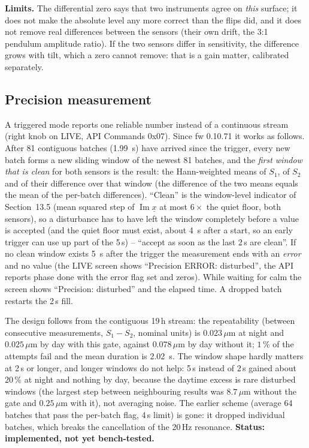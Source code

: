 \documentclass[11pt,a4paper]{article}
\begin{document}
\textbf{Limits.}  The differential zero says that two instruments agree on
\emph{this} surface; it does not make the absolute level any more correct
than the flips did, and it does not remove real differences between the
sensors (their own drift, the 3:1 pendulum amplitude ratio).  If the two
sensors differ in sensitivity, the difference grows with tilt, which a zero
cannot remove: that is a gain matter, calibrated separately.

\subsection{Precision measurement}

A triggered mode reports one reliable number instead of a continuous
stream (right knob on LIVE, API Commands 0x07).  Since fw 0.10.71 it works
as follows.  After 81 contiguous batches (\SI{1.99}{\second}) have arrived
since the trigger, every new batch forms a new sliding window of the newest 81
batches, and the \emph{first window that is clean} for both sensors is the
result: the Hann-weighted means of $S_1$, of $S_2$ and of their difference over that
window (the difference of the two means equals the mean of the per-batch
differences).  ``Clean'' is the window-level indicator of
Section~13.5 (mean squared step of $\operatorname{Im}\underline{x}$ at most $6\times$
the quiet floor, both sensors), so a disturbance has to have left the window
completely before a value is accepted (and the quiet floor must exist, about
\SI{4}{\second} after a start, so an early trigger can use up part of the 5\,s) -- ``accept as soon as the last 2\,s are
clean''.  If no clean window exists \SI{5}{\second} after the trigger the
measurement ends with an \emph{error} and no value (the LIVE screen shows
``Precision ERROR: disturbed'', the API reports phase done with the error flag
set and zeros).  While waiting for calm the screen shows ``Precision: disturbed''
and the elapsed time.  A dropped batch restarts the 2\,s fill.

The design follows from the contiguous 19\,h stream: the repeatability
(between consecutive measurements, $S_1-S_2$, nominal units) is
$0.023\,\mu$m at night and $0.025\,\mu$m by day with this gate, against
$0.078\,\mu$m by day without it; $1$\,\% of the attempts fail and the mean
duration is \SI{2.02}{\second}.  The window shape hardly matters at 2\,s or
longer, and longer windows do not help: 5\,s instead of 2\,s gained about
$20$\,\% at night and nothing by day, because the daytime excess is rare
disturbed windows (the largest step between neighbouring results was
$8.7\,\mu$m without the gate and $0.25\,\mu$m with it), not averaging noise.
The earlier scheme (average 64 batches that pass the per-batch flag, 4\,s
limit) is gone: it dropped individual batches, which breaks the cancellation of
the 20\,Hz resonance.  \textbf{Status: implemented, not yet bench-tested.}
\end{document}
